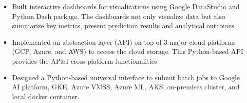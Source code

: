 \documentclass[11pt,a4paper,roman]{moderncv}
\begin{document}
{{\begin{itemize}
\item Built interactive dashboards for visualizations using Google DataStudio and Python Dash package. The dashboards not only visualize data but also summarize key metrics, present prediction results and analytical outcomes. 
\item Implemented an abstraction layer (API) on top of 3 major cloud platforms (GCP, Azure, and AWS) to access the cloud storage. This Python-based API provides the AP\&I cross-platform functionalities.
\item Designed a Python-based universal interface to submit batch jobs to Google AI platform, GKE, Azure VMSS, Azure ML, AKS, on-premises cluster, and local docker container.

\end{itemize}}}
\end{document}
